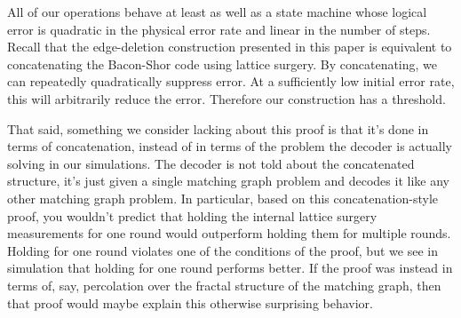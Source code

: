 \documentclass[onecolumn,unpublished,a4paper]{quantumarticle}
\theoremstyle{definition}
\theoremstyle{definition}
\theoremstyle{definition}
\begin{document}
All of our operations behave at least as well as a state machine whose logical error is quadratic in the physical error rate and linear in the number of steps.
Recall that the edge-deletion construction presented in this paper is equivalent to concatenating the Bacon-Shor code using lattice surgery.
By concatenating, we can repeatedly quadratically suppress error.
At a sufficiently low initial error rate, this will arbitrarily reduce the error.
Therefore our construction has a threshold.

That said, something we consider lacking about this proof is that it's done in terms of concatenation, instead of in terms of the problem the decoder is actually solving in our simulations.
The decoder is not told about the concatenated structure, it's just given a single matching graph problem and decodes it like any other matching graph problem.
In particular, based on this concatenation-style proof, you wouldn't predict that holding the internal lattice surgery measurements for one round would outperform holding them for multiple rounds.
Holding for one round violates one of the conditions of the proof, but we see in simulation that holding for one round performs better.
If the proof was instead in terms of, say, percolation over the fractal structure of the matching graph, then that proof would maybe explain this otherwise surprising behavior.
\end{document}
